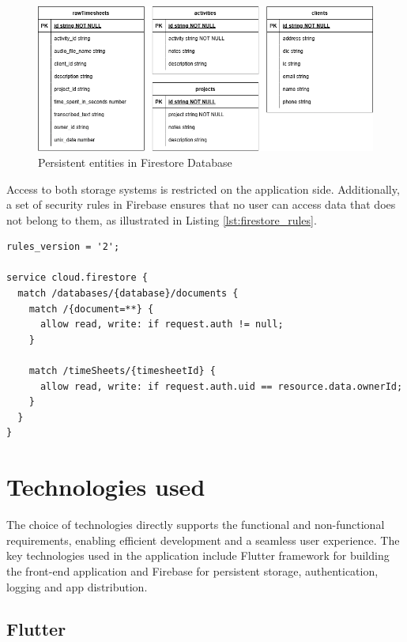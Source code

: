 \documentclass[
  digital,     %
  oneside,     %
  nosansbold,  %
  nocolorbold, %
  lof,         %
  lot,         %
]{fithesis4}
\begin{document}
\begin{figure}[ht]
    \centering
    \includegraphics[width=\textwidth]{assets/diagrams/entity-relationship-diagram.drawio.png}
    \caption{Persistent entities in Firestore Database}
    \label{fig:entity_diagram}
\end{figure}

Access to both storage systems is restricted on the application side. Additionally, a set of security rules in Firebase ensures that no user can access data that does not belong to them, as illustrated in Listing \ref{lst:firestore_rules}.

\newpage
\begin{lstlisting}[language=Firestore, caption={Firestore Security Rules}, label={lst:firestore_rules}, floatplacement=H, showstringspaces=false, showstringspaces=false]
rules_version = '2';

service cloud.firestore {
  match /databases/{database}/documents {
    match /{document=**} {
      allow read, write: if request.auth != null;
    }

    match /timeSheets/{timesheetId} {
      allow read, write: if request.auth.uid == resource.data.ownerId;
    }
  }
}
\end{lstlisting}

\chapter{Technologies used}

The choice of technologies directly supports the functional and non-functional requirements, enabling efficient development and a seamless user experience. The key technologies used in the application include Flutter framework for building the front-end application and Firebase for persistent storage, authentication, logging and app distribution.

\section{Flutter}
\end{document}
